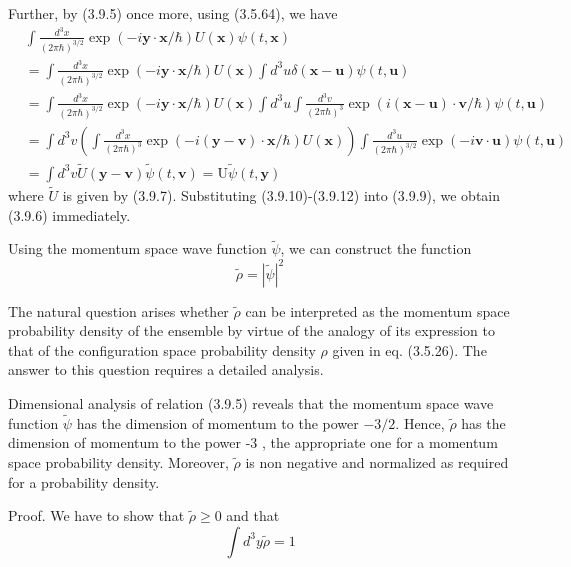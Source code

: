 \documentclass{article}
\begin{document}
Further, by (3.9.5) once more, using (3.5.64), we have
$$
\begin{align*}
& \int \frac{d^{3} x}{(2 \pi \hbar)^{3 / 2}} \exp (-i \boldsymbol{y} \cdot \boldsymbol{x} / \hbar) U(\boldsymbol{x}) \psi(t, \boldsymbol{x})  \tag{3.9.12}\\
& =\int \frac{d^{3} x}{(2 \pi \hbar)^{3 / 2}} \exp (-i \boldsymbol{y} \cdot \boldsymbol{x} / \hbar) U(\boldsymbol{x}) \int d^{3} u \delta(\boldsymbol{x}-\boldsymbol{u}) \psi(t, \boldsymbol{u}) \\
& =\int \frac{d^{3} x}{(2 \pi \hbar)^{3 / 2}} \exp (-i \boldsymbol{y} \cdot \boldsymbol{x} / \hbar) U(\boldsymbol{x}) \int d^{3} u \int \frac{d^{3} v}{(2 \pi \hbar)^{3}} \exp (i(\boldsymbol{x}-\boldsymbol{u}) \cdot \boldsymbol{v} / \hbar) \psi(t, \boldsymbol{u}) \\
& =\int d^{3} v\left(\int \frac{d^{3} x}{(2 \pi \hbar)^{3}} \exp (-i(\boldsymbol{y}-\boldsymbol{v}) \cdot \boldsymbol{x} / \hbar) U(\boldsymbol{x})\right) \int \frac{d^{3} u}{(2 \pi \hbar)^{3 / 2}} \exp (-i \boldsymbol{v} \cdot \boldsymbol{u}) \psi(t, \boldsymbol{u}) \\
& =\int d^{3} v \tilde{U}(\boldsymbol{y}-\boldsymbol{v}) \tilde{\psi}(t, \boldsymbol{v})=\mathrm{U} \tilde{\psi}(t, \boldsymbol{y})
\end{align*}
$$
where $\tilde{U}$ is given by (3.9.7). Substituting (3.9.10)-(3.9.12) into (3.9.9), we obtain (3.9.6) immediately.

Using the momentum space wave function $\tilde{\psi}$, we can construct the function
$$
\begin{equation*}
\tilde{\rho}=|\tilde{\psi}|^{2} \tag{3.9.13}
\end{equation*}
$$

The natural question arises whether $\tilde{\rho}$ can be interpreted as the momentum space probability density of the ensemble by virtue of the analogy of its expression to that of the configuration space probability density $\rho$ given in eq. (3.5.26). The answer to this question requires a detailed analysis.

Dimensional analysis of relation (3.9.5) reveals that the momentum space wave function $\tilde{\psi}$ has the dimension of momentum to the power $-3 / 2$. Hence, $\tilde{\rho}$ has the dimension of momentum to the power -3 , the appropriate one for a momentum space probability density. Moreover, $\tilde{\rho}$ is non negative and normalized as required for a probability density.

Proof. We have to show that $\tilde{\rho} \geq 0$ and that
$$
\begin{equation*}
\int d^{3} y \tilde{\rho}=1 \tag{3.9.14}
\end{equation*}
$$
\end{document}
